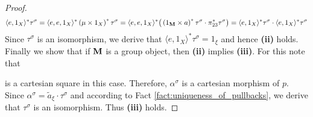 \begin{proof}
$$\langle e, 1_X\rangle^*\tau^{\sigma} = \langle e, e, 1_X\rangle^*\left(\mu\times 1_X\right)^*\tau^{\sigma} =  \langle e, e, 1_X\rangle^*\big(\left(1_{\mathbf{M}}\times a\right)^*\tau^{\sigma}\cdot \pi_{23}^*\tau^{\sigma}\big) = \langle e, 1_X\rangle^*\tau^{\sigma}\cdot \langle e, 1_X\rangle^*\tau^{\sigma}$$
Since $\tau^{\sigma}$ is an isomorphism, we derive that $\langle e, 1_X\rangle^*\tau^{\sigma} = 1_{\xi}$ and hence \textbf{(ii)} holds.\\
Finally we show that if $\mathbf{M}$ is a group object, then \textbf{(ii)} implies \textbf{(iii)}. For this note that 
\begin{center}
\end{center}
is a cartesian square in this case. Therefore, $\alpha^{\sigma}$ is a cartesian morphism of $p$. Since $\alpha^{\sigma} = \widetilde{a}_{\xi}\cdot \tau^{\sigma}$ and according to Fact \ref{fact:uniqueness_of_pullbacks}, we derive that $\tau^{\sigma}$ is an isomorphism. Thus \textbf{(iii)} holds.
\end{proof}

